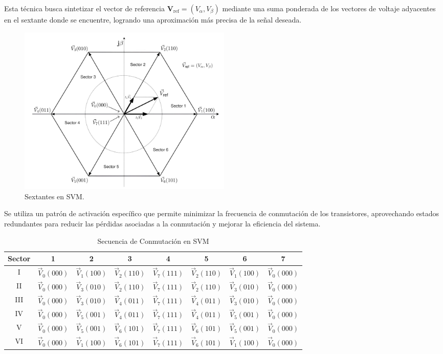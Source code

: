 \documentclass[11pt]{report}
\begin{document}
Esta técnica busca sintetizar el vector de referencia $\mathbf{V}_{\text{ref}}=(V_{\alpha},V_{\beta})$ mediante una suma ponderada de los vectores de voltaje adyacentes en el sextante donde se encuentre, logrando una aproximación más precisa de la señal deseada.

\begin{figure}[ht]
	\centering
	\includegraphics[width=0.5\textwidth]{imagenes/Diagramas/sectantes.png}
	\caption{Sextantes en SVM.}
\end{figure}
\FloatBarrier

Se utiliza un patrón de activación específico que permite minimizar la frecuencia de conmutación de los transistores, aprovechando estados redundantes para reducir las pérdidas asociadas a la conmutación y mejorar la eficiencia del sistema. \cite{power_conv_06}

\begin{table}[htbp]
	\centering
	\caption{Secuencia de Conmutación en SVM}
	\begin{tabular}{ c c c c c c c c }
		\hline
		\textbf{Sector} & \textbf{1}       & \textbf{2}       & \textbf{3}       & \textbf{4}       & \textbf{5}       & \textbf{6}       & \textbf{7}       \\
		\hline
		I               & $\vec{V}_0(000)$ & $\vec{V}_1(100)$ & $\vec{V}_2(110)$ & $\vec{V}_7(111)$ & $\vec{V}_2(110)$ & $\vec{V}_1(100)$ & $\vec{V}_0(000)$ \\
		II              & $\vec{V}_0(000)$ & $\vec{V}_3(010)$ & $\vec{V}_2(110)$ & $\vec{V}_7(111)$ & $\vec{V}_2(110)$ & $\vec{V}_3(010)$ & $\vec{V}_0(000)$ \\
		III             & $\vec{V}_0(000)$ & $\vec{V}_3(010)$ & $\vec{V}_4(011)$ & $\vec{V}_7(111)$ & $\vec{V}_4(011)$ & $\vec{V}_3(010)$ & $\vec{V}_0(000)$ \\
		IV              & $\vec{V}_0(000)$ & $\vec{V}_5(001)$ & $\vec{V}_4(011)$ & $\vec{V}_7(111)$ & $\vec{V}_4(011)$ & $\vec{V}_5(001)$ & $\vec{V}_0(000)$ \\
		V               & $\vec{V}_0(000)$ & $\vec{V}_5(001)$ & $\vec{V}_6(101)$ & $\vec{V}_7(111)$ & $\vec{V}_6(101)$ & $\vec{V}_5(001)$ & $\vec{V}_0(000)$ \\
		VI              & $\vec{V}_0(000)$ & $\vec{V}_1(100)$ & $\vec{V}_6(101)$ & $\vec{V}_7(111)$ & $\vec{V}_6(101)$ & $\vec{V}_1(100)$ & $\vec{V}_0(000)$ \\
		\hline
	\end{tabular}
\end{table}
\end{document}
